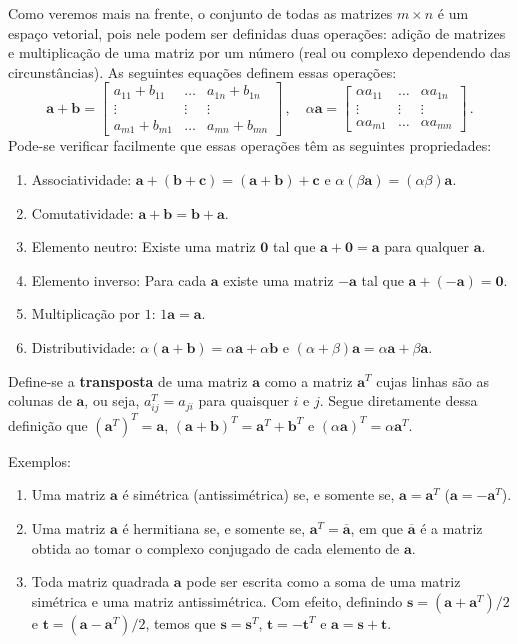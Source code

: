 \documentclass[12pt,a4paper]{report}
\newcommand{\tb}{\textbf}
\newcommand{\mb}{\mathbf}
\begin{document}
Como veremos mais na frente, o conjunto de todas as matrizes $m\times n$ é um espaço vetorial, pois nele podem ser definidas duas operações: adição de matrizes e multiplicação de uma matriz por um número (real ou complexo dependendo das circunstâncias). As seguintes equações definem essas operações:
$$\mb{a}+\mb{b}=\begin{bmatrix}
  a_{11}+b_{11}&\ldots&a_{1n}+b_{1n}\\
  \vdots&\vdots&\vdots\\
  a_{m1}+b_{m1}&\ldots&a_{mn}+b_{mn}
\end{bmatrix}\,,\quad
\alpha\mb{a}=\begin{bmatrix}
  \alpha a_{11}&\ldots&\alpha a_{1n}\\
  \vdots&\vdots&\vdots\\
  \alpha a_{m1}&\ldots&\alpha a_{mn}
\end{bmatrix}\,.$$
Pode-se verificar facilmente que essas operações têm as seguintes propriedades:
\begin{enumerate}
  \item Associatividade: $\mb{a}+(\mb{b}+\mb{c})=(\mb{a}+\mb b)+\mb c$ e $\alpha(\beta \mb a)=(\alpha\beta)\mb a$.
  \item Comutatividade: $\mb a+\mb b=\mb b+\mb a$.
  \item Elemento neutro: Existe uma matriz $\mb 0$ tal que $\mb a+\mb 0=\mb a$ para qualquer $\mb a$.
  \item Elemento inverso: Para cada $\mb a$ existe uma matriz $-\mb a$ tal que $\mb a+(-\mb a)=\mb 0$.
  \item Multiplicação por $1$: $1\mb a=\mb a$.
  \item Distributividade: $\alpha(\mb a+\mb b)=\alpha\mb a+\alpha\mb b$ e $(\alpha+\beta)\mb a=\alpha\mb a+\beta\mb a$.
\end{enumerate}

Define-se a \tb{transposta} de uma matriz $\mb a$ como a matriz $\mb a^T$ cujas linhas são as colunas de $\mb a$, ou seja, $a_{ij}^T=a_{ji}$ para quaisquer $i$ e $j$. Segue diretamente dessa definição que $(\mb a^T)^T=\mb a$, $(\mb a+\mb b)^T=\mb a^T+\mb b^T$ e $(\alpha\mb a)^T=\alpha\mb a^T$.

Exemplos:

\begin{enumerate}
  \item Uma matriz $\mb a$ é simétrica (antissimétrica) se, e somente se, $\mb a=\mb a^T$ ($\mb a=-\mb a^T$).
  \item Uma matriz $\mb a$ é hermitiana se, e somente se, $\mb a^T=\overline{\mb a}$, em que $\overline{\mb a}$ é a matriz obtida ao tomar o complexo conjugado de cada elemento de $\mb a$.
  \item Toda matriz quadrada $\mb a$ pode ser escrita como a soma de uma matriz simétrica e uma matriz antissimétrica. Com efeito, definindo $\mb s=(\mb a+\mb a^T)/2$ e $\mb t=(\mb a-\mb a^T)/2$, temos que $\mb s=\mb s^T$, $\mb t=-\mb t^T$ e $\mb a=\mb s+\mb t$.
\end{enumerate}
\end{document}
